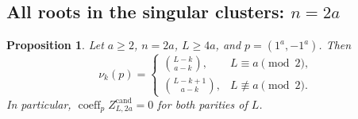 \documentclass[11pt]{article}
\newtheorem{proposition}{Proposition}[section]
\theoremstyle{definition}
\begin{document}
\subsection{All roots in the singular clusters: $n=2a$}

\begin{proposition}\label{prop:pure-balanced-pairs}
Let $a\ge2$, $n=2a$, $L\ge4a$, and $p=(1^a,-1^a)$. Then
\begin{equation}\label{eq:pure-balanced-local-lengths}
 \nu_k(p)=
 \begin{cases}
 \displaystyle\binom{L-k}{a-k},&L\equiv a\pmod2,\\[4pt]
 \displaystyle\binom{L-k+1}{a-k},&L\not\equiv a\pmod2.
 \end{cases}
\end{equation}
In particular, $\operatorname{coeff}_p Z^{\mathrm{cand}}_{L,2a}=0$
for both parities of $L$.
\end{proposition}
\end{document}
